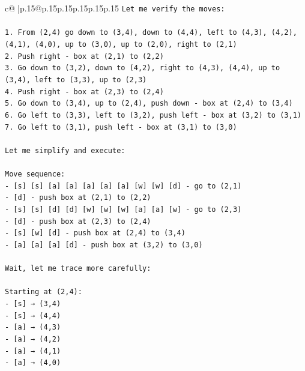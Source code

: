 \documentclass{article}
\begin{document}
{\begin{supertabular}{c@{$\;$}|p{.15\linewidth}@{}p{.15\linewidth}p{.15\linewidth}p{.15\linewidth}p{.15\linewidth}p{.15\linewidth}}
{{{\texttt{Let me verify the moves:} \\
\\ 
\texttt{1. From (2,4) go down to (3,4), down to (4,4), left to (4,3), (4,2), (4,1), (4,0), up to (3,0), up to (2,0), right to (2,1)} \\
\texttt{2. Push right {-} box at (2,1) to (2,2)} \\
\texttt{3. Go down to (3,2), down to (4,2), right to (4,3), (4,4), up to (3,4), left to (3,3), up to (2,3)} \\
\texttt{4. Push right {-} box at (2,3) to (2,4)} \\
\texttt{5. Go down to (3,4), up to (2,4), push down {-} box at (2,4) to (3,4)} \\
\texttt{6. Go left to (3,3), left to (3,2), push left {-} box at (3,2) to (3,1)} \\
\texttt{7. Go left to (3,1), push left {-} box at (3,1) to (3,0)} \\
\\ 
\texttt{Let me simplify and execute:} \\
\\ 
\texttt{Move sequence:} \\
\texttt{{-} {[}s{]} {[}s{]} {[}a{]} {[}a{]} {[}a{]} {[}a{]} {[}a{]} {[}w{]} {[}w{]} {[}d{]} {-} go to (2,1)} \\
\texttt{{-} {[}d{]} {-} push box at (2,1) to (2,2)} \\
\texttt{{-} {[}s{]} {[}s{]} {[}d{]} {[}d{]} {[}w{]} {[}w{]} {[}w{]} {[}a{]} {[}a{]} {[}w{]} {-} go to (2,3)} \\
\texttt{{-} {[}d{]} {-} push box at (2,3) to (2,4)} \\
\texttt{{-} {[}s{]} {[}w{]} {[}d{]} {-} push box at (2,4) to (3,4)} \\
\texttt{{-} {[}a{]} {[}a{]} {[}a{]} {[}d{]} {-} push box at (3,2) to (3,0)} \\
\\ 
\texttt{Wait, let me trace more carefully:} \\
\\ 
\texttt{Starting at (2,4):} \\
\texttt{{-} {[}s{]} → (3,4)} \\
\texttt{{-} {[}s{]} → (4,4)} \\
\texttt{{-} {[}a{]} → (4,3)} \\
\texttt{{-} {[}a{]} → (4,2)} \\
\texttt{{-} {[}a{]} → (4,1)} \\
\texttt{{-} {[}a{]} → (4,0)} \\
}}}
\end{supertabular}}
\end{document}
